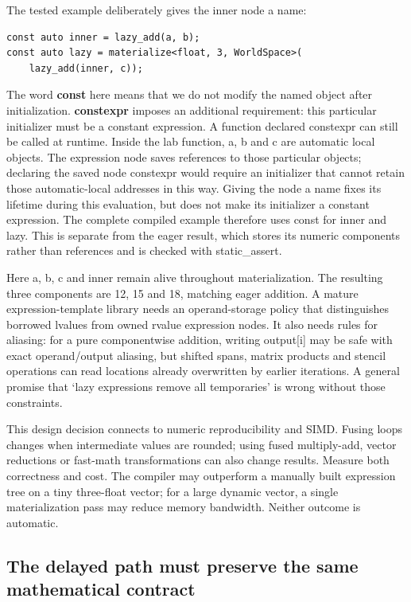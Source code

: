 The tested example deliberately gives the inner node a name:

\begin{verbatim}
const auto inner = lazy_add(a, b);
const auto lazy = materialize<float, 3, WorldSpace>(
    lazy_add(inner, c));
\end{verbatim}

The word \textbf{const} here means that we do not modify the named object after initialization. \textbf{constexpr} imposes an additional requirement: this particular initializer must be a constant expression. A function declared constexpr can still be called at runtime. Inside the lab function, a, b and c are automatic local objects. The expression node saves references to those particular objects; declaring the saved node constexpr would require an initializer that cannot retain those automatic-local addresses in this way. Giving the node a name fixes its lifetime during this evaluation, but does not make its initializer a constant expression. The complete compiled example therefore uses const for inner and lazy. This is separate from the eager result, which stores its numeric components rather than references and is checked with static\_assert.

Here a, b, c and inner remain alive throughout materialization. The resulting three components are 12, 15 and 18, matching eager addition. A mature expression-template library needs an operand-storage policy that distinguishes borrowed lvalues from owned rvalue expression nodes. It also needs rules for aliasing: for a pure componentwise addition, writing output{[}i{]} may be safe with exact operand/output aliasing, but shifted spans, matrix products and stencil operations can read locations already overwritten by earlier iterations. A general promise that `lazy expressions remove all temporaries' is wrong without those constraints.

This design decision connects to numeric reproducibility and SIMD. Fusing loops changes when intermediate values are rounded; using fused multiply-add, vector reductions or fast-math transformations can also change results. Measure both correctness and cost. The compiler may outperform a manually built expression tree on a tiny three-float vector; for a large dynamic vector, a single materialization pass may reduce memory bandwidth. Neither outcome is automatic.

\subsection{The delayed path must preserve the same mathematical contract}\label{01-foundations-i-ch007-the-delayed-path-must-preserve-the-same-mathematical-contract}

